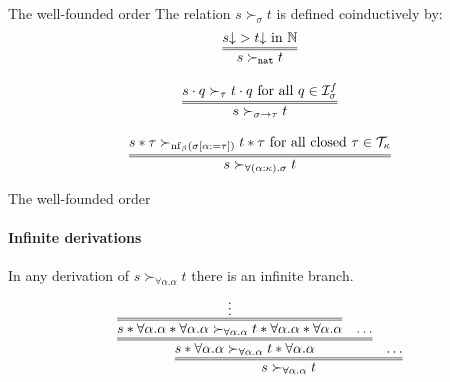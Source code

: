 \documentclass[10pt,presentation,color=names]{beamer}
\newcommand{\Iterms}{\mathcal{I}}
\newcommand{\arrtype}{\rightarrow}
\newcommand{\app}[2]{#1 \cdot #2}
\newcommand{\tapp}[2]{#1 * #2}
\newcommand{\subst}[2]{#1:=#2}
\newcommand{\nat}{\mathtt{nat}}
\newcommand{\Tc}{\mathcal{T}}
\newcommand{\nf}{\mathrm{nf}}
\newcommand{\da}{\mathord{\downarrow}}
\begin{document}
\begin{frame}{The well-founded order}
  The relation $s \succ_{\sigma} t$ is defined coinductively by:
  \[
  \begin{array}{c}
    \infer={s \succ_\nat t}{s\da > t\da \text{ in }\mathbb{N}} \\ \\
    \infer={s \succ_{\sigma\arrtype\tau} t}{\app{s}{q} \succ_{\tau} \app{t}{q} \text{ for all } q \in \Iterms^f_\sigma} \\ \\
    \infer={s \succ_{\forall(\alpha:\kappa).\sigma} t}{\tapp{s}{\tau} \succ_{\nf_\beta(\sigma[\subst{\alpha}{\tau}])} \tapp{t}{\tau} \text{ for all closed } \tau \in \Tc_{\kappa}}
  \end{array}
  \]
\end{frame}

\begin{frame}{The well-founded order}
  \framesubtitle{Infinite derivations}
  In any derivation of $s \succ_{\forall\alpha . \alpha} t$ there is an infinite branch.
  \[
  \infer={s \succ_{\forall \alpha . \alpha} t}{\infer={\tapp{s}{\forall\alpha.\alpha} \succ_{\forall \alpha . \alpha}
    \tapp{t}{\forall\alpha.\alpha}}{\infer={\tapp{\tapp{s}{\forall\alpha.\alpha}}{\forall \alpha . \alpha} \succ_{\forall \alpha . \alpha}
\tapp{\tapp{t}{\forall\alpha.\alpha}}{\forall\alpha.\alpha}}{\vdots} & \ldots} & \ldots}
  \]
\end{frame}
\end{document}
